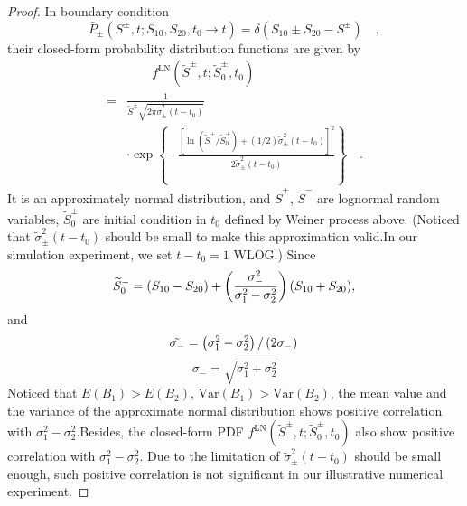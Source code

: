 \begin{appendices}
\begin{proof}
In boundary condition 
 \begin{equation*}
     \bar{P}_{\pm}\left(S^{\pm}, t ; S_{10}, S_{20}, t_{0} \longrightarrow t\right)=\delta\left(S_{10} \pm S_{20}-S^{\pm}\right) \quad,
 \end{equation*}
their closed-form probability distribution functions are given by 
  \begin{equation*}
  \begin{aligned}
     &\qquad f^{\mathrm{LN}}\left(\tilde{S}^{\pm}, t ; \tilde{S}_{0}^{\pm}, t_{0}\right)\\
     = &\frac{1}{\widetilde{S}^{\pm} \sqrt{2 \pi \tilde{\sigma}_{\pm}^{2}\left(t-t_{0}\right)}} \\
      &\cdot \exp \left\{-\frac{\left[\ln \left(\tilde{S}^{+} / \tilde{S}_{0}^{+}\right)+(1 / 2) \tilde{\sigma}_{\pm}^{2}\left(t-t_{0}\right)\right]^{2}}{2 \tilde{\sigma}_{\pm}^{2}\left(t-t_{0}\right)}\right\} \quad.
 \end{aligned}
 \end{equation*}
It is an approximately normal distribution, and $\tilde{S}^{+}$, $\tilde{S}^{-}$ are lognormal random variables, $\tilde{S}_{0}^{\pm}$ are initial condition in $t_0$ defined by Weiner process above. (Noticed that $\tilde{\sigma}_{\pm}^{2}\left(t-t_{0}\right)$ should be small to make this approximation valid.In our simulation experiment, we set $t-t_0=1$ WLOG.) Since
\begin{equation*}
\widetilde{S}_{0}^{-}=(S_{10}-S_{20})+\left(\frac{\sigma_{-}^{2}}{\sigma_{1}^{2}-\sigma_{2}^{2}}\right) (S_{10}+S_{20}),\\ 
\end{equation*}
and
\begin{equation*}
    \tilde{\sigma_-}=\left(\sigma_{1}^{2}-\sigma_{2}^{2}\right) /\left(2 \sigma_{-}\right)\\
\end{equation*}
\begin{equation*}
    \sigma_-=\sqrt{\sigma_1^2+\sigma_2^2}
\end{equation*}
Noticed that $E(B_1)>E(B_2)$, $\mathrm{Var}(B_1)>\mathrm{Var}(B_2)$, the mean value and the variance of the approximate normal distribution shows positive correlation with $\sigma_1^2-\sigma_2^2$.Besides, the closed-form PDF $f^{\mathrm{LN}}\left(\tilde{S}^{\pm}, t ; \tilde{S}_{0}^{\pm}, t_{0}\right)$ also show positive correlation with $\sigma_1^2-\sigma_2^2$. Due to the limitation of $\tilde{\sigma}_{\pm}^{2}\left(t-t_{0}\right)$ should be small enough, such positive correlation is not significant in our illustrative numerical experiment.


\end{proof}
\end{appendices}

